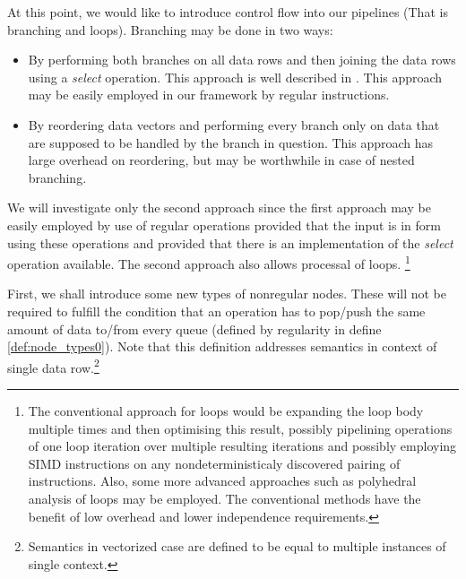 At this point, we would like to introduce control flow into our pipelines (That is branching and loops). Branching may be done in two ways:

\label{sec:branching}
\begin{itemize}
  \item By performing both branches on all data rows and then joining the data rows using a \emph{select} operation. This approach is well described in \cite{secondpaper}. This approach may be easily employed in our framework by regular instructions. 
  \item By reordering data vectors and performing every branch only on data that are supposed to be handled by the branch in question. This approach has large overhead on reordering, but may be worthwhile in case of nested branching.
\end{itemize}

We will investigate only the second approach since the first approach may be easily employed by use of regular operations provided that the input is in form using these operations and provided that there is an implementation of the \emph{select} operation available. The second approach also allows processal of loops. \footnote{The conventional approach for loops would be expanding the loop body multiple times and then optimising this result, possibly pipelining operations of one loop iteration over multiple resulting iterations and possibly employing SIMD instructions on any nondeterministicaly discovered pairing of instructions\cite{compilers}. Also, some more advanced approaches such as polyhedral analysis of loops may be employed\cite{polyhedral}. The conventional methods have the benefit of low overhead and lower independence requirements. }

\label{sec:node_types}

First, we shall introduce some new types of nonregular nodes. These will not be required to fulfill the condition that an operation has to pop/push the same amount of data to/from every queue (defined by regularity in define \ref{def:node_types0}). Note that this definition addresses semantics in context of single data row.\footnote{Semantics in vectorized case are defined to be equal to multiple instances of single context.}

